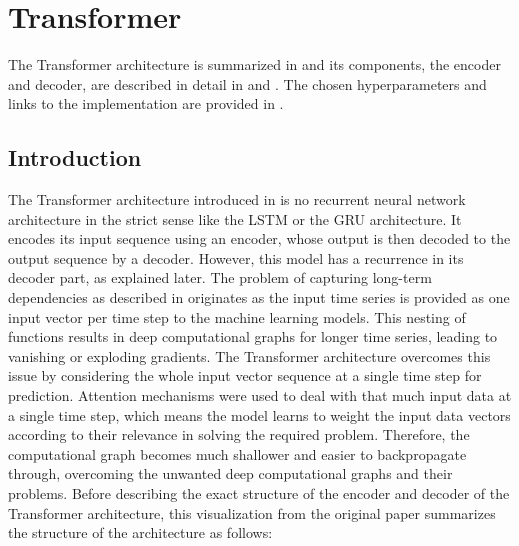 \documentclass[draft,final]{vutinfth} %
\begin{document}
    \section{Transformer} \label{transformer}
    The Transformer architecture \cite{Transformer} is summarized in  and its components, the encoder and decoder, are described in detail in  and .
    The chosen hyperparameters and links to the implementation are provided in .

    \subsection{Introduction} \label{transformer_introduction}
    The Transformer architecture introduced in \cite{Transformer} is no recurrent neural network architecture in the strict sense like the LSTM or the GRU architecture.
    It encodes its input sequence using an encoder, whose output is then decoded to the output sequence by a decoder.
    However, this model has a recurrence in its decoder part, as explained later.
    The problem of capturing long-term dependencies as described in  originates as the input time series is provided as one input vector per time step to the machine learning models.
    This nesting of functions results in deep computational graphs for longer time series, leading to vanishing or exploding gradients.
    The Transformer architecture overcomes this issue by considering the whole input vector sequence at a single time step for prediction.
    Attention mechanisms were used to deal with that much input data at a single time step, which means the model learns to weight the input data vectors according to their relevance in solving the required problem.
    Therefore, the computational graph becomes much shallower and easier to backpropagate through, overcoming the unwanted deep computational graphs and their problems.
    Before describing the exact structure of the encoder and decoder of the Transformer architecture, this visualization from the original paper summarizes the structure of the architecture as follows:
\end{document}
